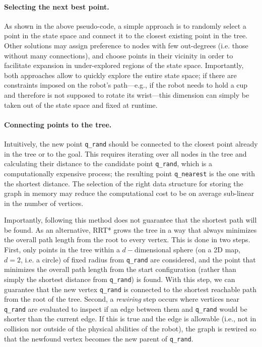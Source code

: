 \paragraph{Selecting the next best point.}

As shown in the above pseudo-code, a simple approach is to randomly select a point in the state space and connect it to the closest existing point in the tree.
Other solutions may assign preference to nodes with few out-degrees (i.e. those without many connections), and choose points in their vicinity in order to facilitate expansion in under-explored regions of the state space.
Importantly, both approaches allow to quickly explore the entire state space; if there are constraints imposed on the robot's path---e.g., if the robot needs to hold a cup and therefore is not supposed to rotate its wrist---this dimension can simply be taken out of the state space and fixed at runtime.

\paragraph{Connecting points to the tree.}

Intuitively, the new point \texttt{q\_rand} should be connected to the closest point already in the tree or to the goal.
This requires iterating over all nodes in the tree and calculating their distance to the candidate point \texttt{q\_rand}, which is a computationally expensive process; the resulting point \texttt{q\_nearest} is the one with the shortest distance.
The selection of the right data structure for storing the graph in memory may reduce the computational cost to be on average sub-linear in the number of vertices.

Importantly, following this method does not guarantee that the shortest path will be found.
As an alternative, RRT* grows the tree in a way that always minimizes the overall path length from the root to every vertex.
This is done in two steps.
First, only points in the tree within a $d-$dimensional sphere (on a 2D map, $d=2$, i.e. a circle) of fixed radius from \texttt{q\_rand} are considered, and the point that minimizes the overall path length from the start configuration (rather than simply the shortest distance from \texttt{q\_rand}) is found. With this step, we can guarantee that the new vertex \texttt{q\_rand} is connected to the shortest reachable path from the root of the tree.
Second, a \textsl{rewiring} step occurs where vertices near \texttt{q\_rand} are evaluated to inspect if an edge between them and \texttt{q\_rand} would be shorter than the current edge. If this is true and the edge is allowable (i.e., not in collision nor outside of the physical abilities of the robot), the graph is rewired so that the newfound vertex becomes the new parent of \texttt{q\_rand}.

